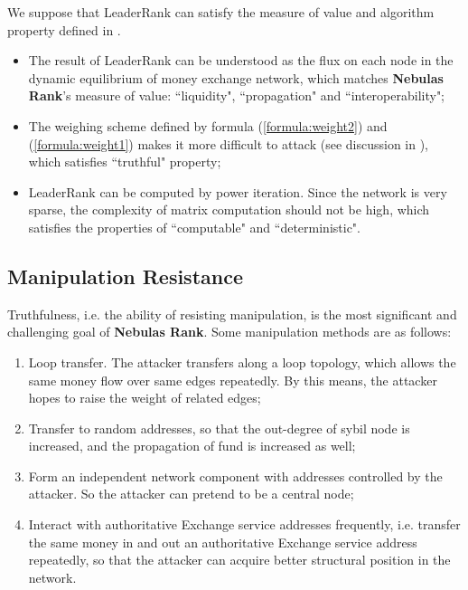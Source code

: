 We suppose that LeaderRank can satisfy the measure of value and algorithm property defined in .
\begin{itemize}
	\item The result of LeaderRank can be understood as the flux on each node in the dynamic equilibrium of money exchange network, which matches \textbf{Nebulas Rank}'s measure of value: ``liquidity", ``propagation" and ``interoperability";
	\item The weighing scheme defined by formula (\ref{formula:weight2}) and (\ref{formula:weight1}) makes it more difficult to attack (see discussion in ), which satisfies ``truthful" property;
	\item LeaderRank can be computed by power iteration. Since the network is very sparse, the complexity of matrix computation should not be high, which satisfies the properties of ``computable" and ``deterministic".
\end{itemize}


\subsection{Manipulation Resistance}\label{subsec:robust}
Truthfulness, i.e. the ability of resisting manipulation, is the most significant and challenging goal of \textbf{Nebulas Rank}. Some manipulation methods are as follows:
\begin{enumerate}
	\item Loop transfer. The attacker transfers along a loop topology, which allows the same money flow over same edges repeatedly. By this means, the attacker hopes to raise the weight of related edges;
	\item Transfer to random addresses, so that the out-degree of sybil node is increased, and the propagation of fund is increased as well;
	\item Form an independent network component with addresses controlled by the attacker. So the attacker can pretend to be a central node;
	\item Interact with authoritative Exchange service addresses frequently, i.e. transfer the same money in and out an authoritative Exchange service address repeatedly, so that the attacker can acquire better structural position in the network.
\end{enumerate}


